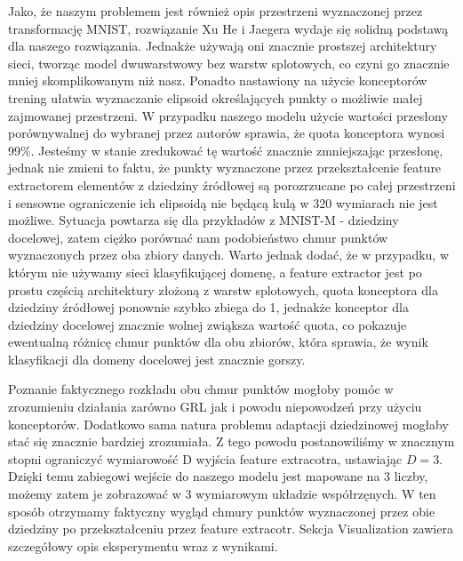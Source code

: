 \documentclass{article}
\begin{document}
Jako, że naszym problemem jest również opis przestrzeni wyznaczonej przez transformację MNIST, rozwiązanie Xu He i Jaegera wydaje się solidną podstawą dla naszego rozwiązania. Jednakże używają oni znacznie prostszej architektury sieci, tworząc model dwuwarstwowy bez warstw splotowych, co czyni go znacznie mniej skomplikowanym niż nasz. Ponadto nastawiony na użycie konceptorów trening ułatwia wyznaczanie elipsoid określających punkty o możliwie małej zajmowanej przestrzeni. W przypadku naszego modelu użycie wartości przesłony porównywalnej do wybranej przez autorów sprawia, że quota konceptora wynosi 99\%. Jesteśmy w stanie zredukować tę wartość znacznie zmniejszając przesłonę, jednak nie zmieni to faktu, że punkty wyznaczone przez przekształcenie feature extractorem elementów z dziedziny źródłowej są porozrzucane po całej przestrzeni i sensowne ograniczenie ich elipsoidą nie będącą kulą w 320 wymiarach nie jest możliwe. Sytuacja powtarza się dla przykładów z MNIST-M - dziedziny docelowej, zatem ciężko porównać nam podobieństwo chmur punktów wyznaczonych przez oba zbiory danych. Warto jednak dodać, że w przypadku, w którym nie używamy sieci klasyfikującej domenę, a feature extractor jest po prostu częścią architektury złożoną z warstw splotowych, quota konceptora dla dziedziny źródłowej ponownie szybko zbiega do 1, jednakże konceptor dla dziedziny docelowej znacznie wolnej zwiąksza wartość quota, co pokazuje ewentualną różnicę chmur punktów dla obu zbiorów, która sprawia, że wynik klasyfikacji dla domeny docelowej jest znacznie gorszy.
\par
Poznanie faktycznego rozkładu obu chmur punktów mogłoby pomóc w zrozumieniu działania zarówno GRL jak i powodu niepowodzeń przy użyciu konceptorów. Dodatkowo sama natura problemu adaptacji dziedzinowej mogłaby stać się znacznie bardziej zrozumiała. Z tego powodu postanowiliśmy w znacznym stopni ograniczyć wymiarowość D wyjścia feature extracotra, ustawiając $D=3$. Dzięki temu zabiegowi wejście do naszego modelu jest mapowane na 3 liczby, możemy zatem je zobrazować w 3 wymiarowym układzie współrzęnych. W ten sposób otrzymamy faktyczny wygląd chmury punktów wyznaczonej przez obie dziedziny po przekształceniu przez feature extracotr. Sekcja Visualization zawiera szczegółowy opis eksperymentu wraz z wynikami.
\par
\end{document}
